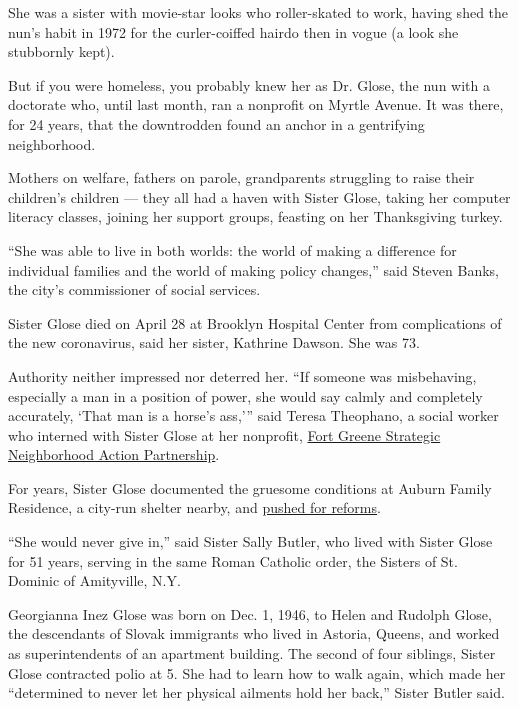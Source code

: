 She was a sister with movie-star looks who roller-skated to work, having
shed the nun's habit in 1972 for the curler-coiffed hairdo then in vogue
(a look she stubbornly kept).

But if you were homeless, you probably knew her as Dr. Glose, the nun
with a doctorate who, until last month, ran a nonprofit on Myrtle
Avenue. It was there, for 24 years, that the downtrodden found an anchor
in a gentrifying neighborhood.

Mothers on welfare, fathers on parole, grandparents struggling to raise
their children's children --- they all had a haven with Sister Glose,
taking her computer literacy classes, joining her support groups,
feasting on her Thanksgiving turkey.

``She was able to live in both worlds: the world of making a difference
for individual families and the world of making policy changes,'' said
Steven Banks, the city's commissioner of social services.

Sister Glose died on April 28 at Brooklyn Hospital Center from
complications of the new coronavirus, said her sister, Kathrine Dawson.
She was 73.

Authority neither impressed nor deterred her. ``If someone was
misbehaving, especially a man in a position of power, she would say
calmly and completely accurately, `That man is a horse's ass,''' said
Teresa Theophano, a social worker who interned with Sister Glose at her
nonprofit, \href{http://www.fortgreenesnap.org/}{Fort Greene Strategic
Neighborhood Action Partnership}.

For years, Sister Glose documented the gruesome conditions at Auburn
Family Residence, a city-run shelter nearby, and
\href{https://www.nytimes3xbfgragh.onion/2014/02/21/nyregion/new-york-is-removing-over-400-children-from-2-homeless-shelters.html}{pushed
for reforms}.

``She would never give in,'' said Sister Sally Butler, who lived with
Sister Glose for 51 years, serving in the same Roman Catholic order, the
Sisters of St. Dominic of Amityville, N.Y.

Georgianna Inez Glose was born on Dec. 1, 1946, to Helen and Rudolph
Glose, the descendants of Slovak immigrants who lived in Astoria,
Queens, and worked as superintendents of an apartment building. The
second of four siblings, Sister Glose contracted polio at 5. She had to
learn how to walk again, which made her ``determined to never let her
physical ailments hold her back,'' Sister Butler said.

